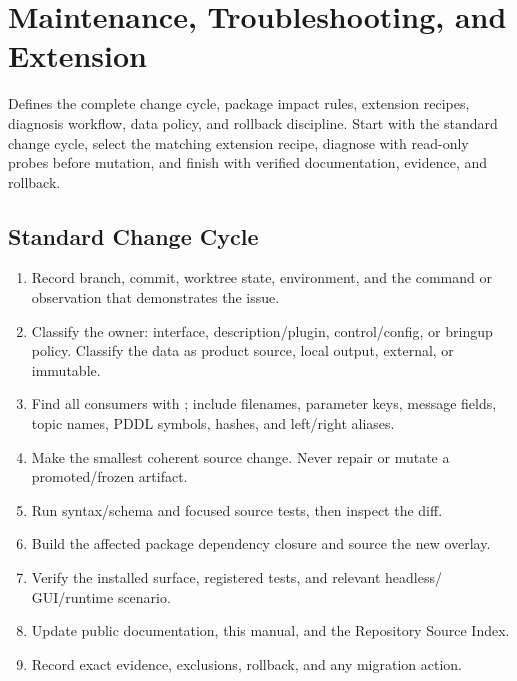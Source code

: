 \chapter{Maintenance, Troubleshooting, and Extension}
\label{ch:maintenance}

\chapteroverview
  {Defines the complete change cycle, package impact rules, extension recipes,
   diagnosis workflow, data policy, and rollback discipline.}
  {Start with the standard change cycle, select the matching extension recipe,
   diagnose with read-only probes before mutation, and finish with verified
   documentation, evidence, and rollback.}

\section{Standard Change Cycle}

\begin{procedurebox}
\begin{enumerate}
  \item Record branch, commit, worktree state, environment, and the command or
        observation that demonstrates the issue.
  \item Classify the owner: interface, description/plugin, control/config, or
        bringup policy. Classify the data as product source, local output,
        external, or immutable.
  \item Find all consumers with ; include filenames, parameter keys,
        message fields, topic names, PDDL symbols, hashes, and left/right aliases.
  \item Make the smallest coherent source change. Never repair 
        or mutate a promoted/frozen artifact.
  \item Run syntax/schema and focused source tests, then inspect the diff.
  \item Build the affected package dependency closure and source the new overlay.
  \item Verify the installed surface, registered tests, and relevant headless/
        GUI/runtime scenario.
  \item Update public documentation, this manual, and the Repository Source
        Index.
  \item Record exact evidence, exclusions, rollback, and any migration action.
\end{enumerate}
\end{procedurebox}

